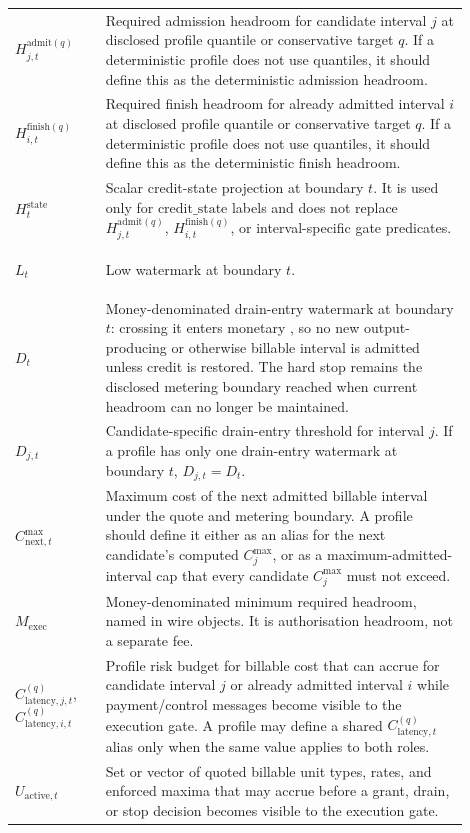 \documentclass[11pt]{article}
\newcommand{\field}[1]{\texttt{\detokenize{#1}}}
\begin{document}
\begin{longtable}{>{\bfseries\raggedright\arraybackslash}p{0.18\linewidth} >{\raggedright\arraybackslash}p{0.72\linewidth}}
\(H_{j,t}^{\mathrm{admit}(q)}\) & Required admission headroom for candidate interval \(j\) at disclosed profile quantile or conservative target \(q\). If a deterministic profile does not use quantiles, it should define this as the deterministic admission headroom. \\
\(H_{i,t}^{\mathrm{finish}(q)}\) & Required finish headroom for already admitted interval \(i\) at disclosed profile quantile or conservative target \(q\). If a deterministic profile does not use quantiles, it should define this as the deterministic finish headroom. \\
\(H_t^{\mathrm{state}}\) & Scalar credit-state projection at boundary \(t\). It is used only for \(\mathrm{credit\_state}\) labels and does not replace \(H_{j,t}^{\mathrm{admit}(q)}\), \(H_{i,t}^{\mathrm{finish}(q)}\), or interval-specific gate predicates. \\
\(L_t\) & Low watermark at boundary \(t\). \\
\(D_t\) & Money-denominated drain-entry watermark at boundary \(t\): crossing it enters monetary \field{draining}, so no new output-producing or otherwise billable interval is admitted unless credit is restored. The hard stop remains the disclosed metering boundary reached when current headroom can no longer be maintained. \\
\(D_{j,t}\) & Candidate-specific drain-entry threshold for interval \(j\). If a profile has only one drain-entry watermark at boundary \(t\), \(D_{j,t}=D_t\). \\
\(C_{\mathrm{next},t}^{\max}\) & Maximum cost of the next admitted billable interval under the quote and metering boundary. A profile should define it either as an alias for the next candidate's computed \(C_j^{\max}\), or as a maximum-admitted-interval cap that every candidate \(C_j^{\max}\) must not exceed. \\
\(M_{\mathrm{exec}}\) & Money-denominated minimum required headroom, named \field{minimum_execution_buffer} in wire objects. It is authorisation headroom, not a separate fee. \\
\(C_{\mathrm{latency},j,t}^{(q)}\), \(C_{\mathrm{latency},i,t}^{(q)}\) & Profile risk budget for billable cost that can accrue for candidate interval \(j\) or already admitted interval \(i\) while payment/control messages become visible to the execution gate. A profile may define a shared \(C_{\mathrm{latency},t}^{(q)}\) alias only when the same value applies to both roles. \\
\(U_{\mathrm{active},t}\) & Set or vector of quoted billable unit types, rates, and enforced maxima that may accrue before a grant, drain, or stop decision becomes visible to the execution gate. \\

\end{longtable}
\end{document}
